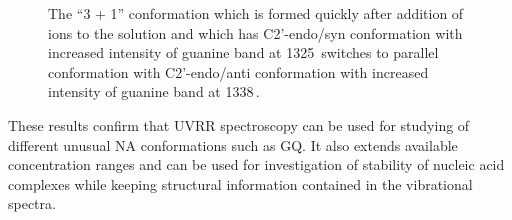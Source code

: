 \begin{figure}
	\centering
	
	\vspace{3mm}
	\caption[%
		Effect of standard anealing and incubation at 37\,\textdegree{}C on UVRR
		spectra of -Tel22.
	]{%
		The “3 + 1” conformation which is formed quickly after addition of 
		ions to the solution and which has C2'-endo/syn conformation with increased
		intensity of guanine band at 1325\,\icm{} switches to parallel conformation
		with C2'-endo/anti conformation with increased intensity of guanine band at
		1338\,\icm{}.
	}
	\label{\figlabel{telXXII:spectra}}
\end{figure}

These results confirm that UVRR spectroscopy can be used for studying of
different unusual NA conformations such as GQ. It also extends available
concentration ranges and can be used for investigation of stability of
nucleic acid complexes while keeping structural information contained in the
vibrational spectra.
